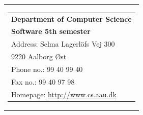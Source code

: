 \Blankpage
{}
\thispagestyle{empty}

    \begin{tabular}{r}
        \parbox{\textwidth}{ %
         \hfill \parbox{4.9cm}{ %
            \begin{tabular}{l} 
                {\textsf{\small{\textbf{Department of Computer Science}}}}\\
                {\textsf{\small{\textbf{Software 5th semester}}}}\\
                {\textsf{\small{Address: Selma Lagerlöfs Vej 300}}} \\
                {\textsf{\small{\hspace{13 mm} 9220 Aalborg Øst }}} \\
                {\textsf{\small{Phone no.: 99 40 99 40}}} \\
                {\textsf{\small{Fax no.: 99 40 97 98}}} \\
                {\textsf{\small{Homepage: \url{http://www.cs.aau.dk}}}}
            \end{tabular}}}
    \end{tabular}
    
